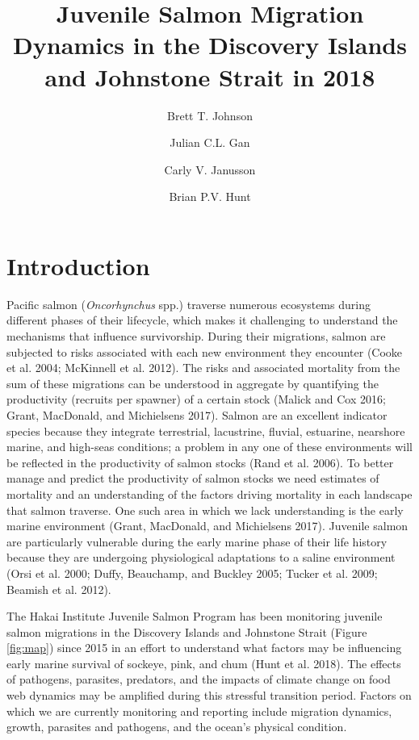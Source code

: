 \documentclass[fleqn,10pt]{wlpeerj} %
\title{Juvenile Salmon Migration Dynamics in the Discovery Islands and
Johnstone Strait in 2018}
\author[1]{Brett T. Johnson}
\author[]{Julian C.L. Gan}
\author[]{Carly V. Janusson}
\author[2, 3]{Brian P.V. Hunt}
\affil[1]{Hakai Institute Quadra Island Ecological Observatory, Heriot Bay, BC
V0P1H0}
\affil[2]{UBC EOS, IOF}
\begin{document}
\flushbottom
\maketitle
\thispagestyle{empty}

\section*{Introduction}\label{introduction}

Pacific salmon (\emph{Oncorhynchus} spp.) traverse numerous ecosystems
during different phases of their lifecycle, which makes it challenging
to understand the mechanisms that influence survivorship. During their
migrations, salmon are subjected to risks associated with each new
environment they encounter (Cooke et al. 2004; McKinnell et al. 2012).
The risks and associated mortality from the sum of these migrations can
be understood in aggregate by quantifying the productivity (recruits per
spawner) of a certain stock (Malick and Cox 2016; Grant, MacDonald, and
Michielsens 2017). Salmon are an excellent indicator species because
they integrate terrestrial, lacustrine, fluvial, estuarine, nearshore
marine, and high-seas conditions; a problem in any one of these
environments will be reflected in the productivity of salmon stocks
(Rand et al. 2006). To better manage and predict the productivity of
salmon stocks we need estimates of mortality and an understanding of the
factors driving mortality in each landscape that salmon traverse. One
such area in which we lack understanding is the early marine environment
(Grant, MacDonald, and Michielsens 2017). Juvenile salmon are
particularly vulnerable during the early marine phase of their life
history because they are undergoing physiological adaptations to a
saline environment (Orsi et al. 2000; Duffy, Beauchamp, and Buckley
2005; Tucker et al. 2009; Beamish et al. 2012).

The Hakai Institute Juvenile Salmon Program has been monitoring juvenile
salmon migrations in the Discovery Islands and Johnstone Strait (Figure
\ref{fig:map}) since 2015 in an effort to understand what factors may be
influencing early marine survival of sockeye, pink, and chum (Hunt et
al. 2018). The effects of pathogens, parasites, predators, and the
impacts of climate change on food web dynamics may be amplified during
this stressful transition period. Factors on which we are currently
monitoring and reporting include migration dynamics, growth, parasites
and pathogens, and the ocean's physical condition.
\end{document}
